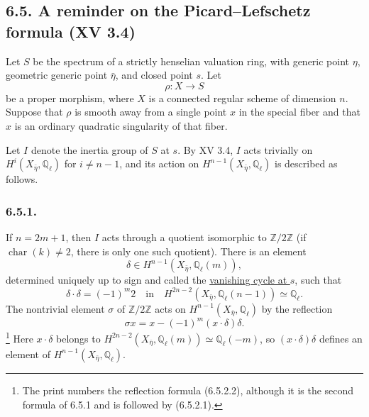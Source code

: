 \subsection*{6.5. A reminder on the Picard--Lefschetz formula (XV 3.4)}

Let $S$ be the spectrum of a strictly henselian valuation ring, with
generic point $\eta$, geometric generic point $\bar\eta$, and closed
point $s$.  Let
\[
\rho:X\longrightarrow S
\]
be a proper morphism, where $X$ is a connected regular scheme of
dimension $n$.  Suppose that $\rho$ is smooth away from a single point
$x$ in the special fiber and that $x$ is an ordinary quadratic
singularity of that fiber.

Let $I$ denote the inertia group of $S$ at $s$.  By XV 3.4, $I$ acts
trivially on $H^i(X_{\bar\eta},\mathbb Q_\ell)$ for $i\ne n-1$, and its
action on $H^{n-1}(X_{\bar\eta},\mathbb Q_\ell)$ is described as follows.

\subsubsection*{6.5.1.}
If $n=2m+1$, then $I$ acts through a quotient isomorphic to
$\mathbb Z/2\mathbb Z$ (if $\operatorname{char}(k)\ne2$, there is only
one such quotient).  There is an element
\[
\delta\in H^{n-1}(X_{\bar\eta},\mathbb Q_\ell(m)),
\]
determined uniquely up to sign and called the \underline{vanishing
cycle at $s$}, such that
\begin{equation}\tag{6.5.1.1}
\delta\cdot\delta=(-1)^m2
\quad\text{in}\quad
H^{2n-2}(X_{\bar\eta},\mathbb Q_\ell(n-1))\simeq\mathbb Q_\ell.
\end{equation}
The nontrivial element $\sigma$ of $\mathbb Z/2\mathbb Z$ acts on
$H^{n-1}(X_{\bar\eta},\mathbb Q_\ell)$ by the reflection
\begin{equation}\tag{6.5.1.2}
\sigma x=x-(-1)^m(x\cdot\delta)\delta.
\end{equation}
\footnote{The print numbers the reflection formula (6.5.2.2), although
it is the second formula of 6.5.1 and is followed by (6.5.2.1).}
Here $x\cdot\delta$ belongs to
$H^{2n-2}(X_{\bar\eta},\mathbb Q_\ell(m))\simeq\mathbb Q_\ell(-m)$,
so $(x\cdot\delta)\delta$ defines an element of
$H^{n-1}(X_{\bar\eta},\mathbb Q_\ell)$.


